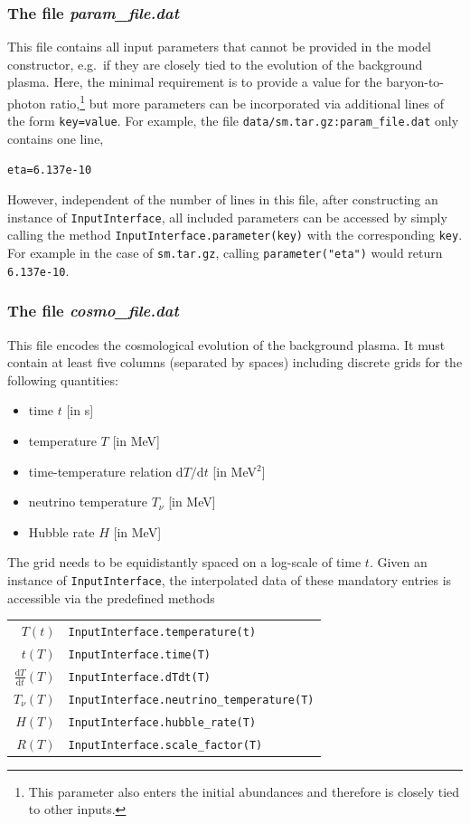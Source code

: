 \documentclass[11pt,a4paper]{article}
\begin{document}
\subsubsection{The file \textit{param\_file.dat}}
This file contains all input parameters that cannot be provided in the model constructor, e.g.\ if they are closely tied to the evolution of the background plasma. Here, the minimal requirement is to provide a value for the baryon-to-photon ratio,\footnote{This parameter also enters the initial abundances and therefore is closely tied to other inputs.} but more parameters can be incorporated via additional lines of the form \texttt{key=value}. For example, the file \texttt{data/sm.tar.gz:param\_file.dat} only contains one line,
\begin{lstlisting}[backgroundcolor=\color{white}]
eta=6.137e-10
\end{lstlisting}
However, independent of the number of lines in this file, after constructing an instance of \texttt{InputInterface}, all included parameters can be accessed by simply calling the method \texttt{InputInterface.parameter(key)} with the corresponding \texttt{key}. For example in the case of \texttt{sm.tar.gz}, calling \texttt{parameter("eta")} would return \texttt{6.137e-10}.

\subsubsection{The file \textit{cosmo\_file.dat}}
This file encodes the cosmological evolution of the background plasma. It must contain at least five columns (separated by spaces) including discrete grids for the following quantities:
\begin{itemize}
\item time $t$ [in s]
\item temperature $T$ [in MeV]
\item time-temperature relation $\text{d}T/\text{d}t$ [in MeV$^2$]
\item neutrino temperature $T_\nu$ [in MeV]
\item Hubble rate $H$ [in MeV]
\end{itemize}
The grid needs to be equidistantly spaced on a log-scale of time $t$. Given an instance of \texttt{InputInterface}, the interpolated data of these mandatory entries is accessible via the predefined methods
\begin{center}
\begin{tabular}{rl}
	$T(t)$ & \texttt{InputInterface.temperature(t)} \\[0.2cm]
	$t(T)$ & \texttt{InputInterface.time(T)} \\[0.2cm]
	$\frac{\text{d}T}{\text{d}t}(T)$ & \texttt{InputInterface.dTdt(T)} \\[0.2cm]
	$T_\nu(T)$ & \texttt{InputInterface.neutrino\_temperature(T)} \\[0.2cm]
	$H(T)$ & \texttt{InputInterface.hubble\_rate(T)} \\[0.2cm]
	$R(T)$ & \texttt{InputInterface.scale\_factor(T)} \\[0.2cm]
\end{tabular}
\end{center}
\end{document}
